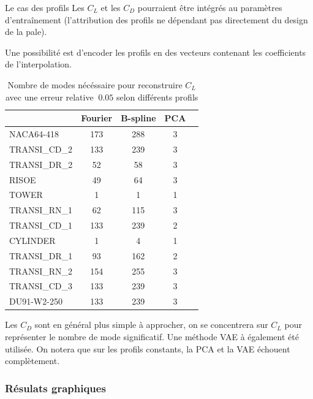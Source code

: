 \documentclass[
11pt,notheorems,hyperref={pdfauthor=whatever}
]{beamer}
\begin{document}
\begin{frame}{Le cas des profils}
    Les $C_L$ et les $C_D$ pourraient être intégrés au paramètres d'entraînement (l'attribution des profils ne dépendant pas directement du design de la pale).

    \vspace{0.1cm}

    Une possibilité est d'encoder les profils en des vecteurs contenant les coefficients de l'interpolation. 
    \begin{table}
        \centering
        \begin{tabular}{|l|c|c|c|c|}
            \hline
             & Fourier & B-spline & PCA \\
            \hline
            NACA64-418 &173 & 288 &3     \\
            \hline
            TRANSI\_CD\_2&133 &239 &3   \\
            \hline
            TRANSI\_DR\_2&52 &58 &3     \\
            \hline
            RISOE  &49  &64 &3          \\
            \hline
            TOWER&1 &1 &1               \\
            \hline
            TRANSI\_RN\_1&62 &115 &3    \\
            \hline
            TRANSI\_CD\_1&133 &239 &2   \\
            \hline
            CYLINDER&1 &4 &1            \\
            \hline
            TRANSI\_DR\_1&93 &162 &2    \\
            \hline
            TRANSI\_RN\_2&154 &255 &3   \\
            \hline
            TRANSI\_CD\_3&133 &239 &3   \\
            \hline
            DU91-W2-250&133 &239 &3     \\
            \hline
        \end{tabular}
        \caption{Nombre de modes nécéssaire pour reconstruire $C_L$ avec une erreur relative $~0.05$ selon différents profils}
    \end{table}
Les $C_D$ sont en général plus simple à approcher, on se concentrera sur $C_L$ pour représenter le nombre de mode significatif.
Une méthode VAE à également été utilisée. On notera que sur les profils constants, la PCA et la VAE échouent complètement.
\end{frame}

\subsubsection{Résulats graphiques}
\end{document}
